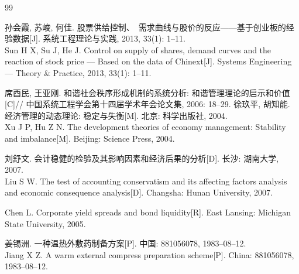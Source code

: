 \documentclass{setp-new}
\begin{document}
\begin{thebibliography}{99}


%
%
%
%
%
 孙会霞, 苏峻, 何佳. 股票供给控制、~需求曲线与股价的反应------基于创业板的经验数据[J]. 系统工程理论与实践, 2013, 33(1): 1--11. \\
Sun H X, Su J, He J. Control on supply of shares, demand curves and the reaction of stock price --- Based on the data of Chinext[J]. Systems Engineering --- Theory \& Practice, 2013, 33(1): 1--11.


%
%
%
 席酉民, 王亚刚. 和谐社会秩序形成机制的系统分析: 和谐管理理论的启示和价值[C]// 中国系统工程学会第十四届学术年会论文集, 2006: 18--29.
%
%
%
%
 徐玖平, 胡知能. 经济管理的动态理论: 稳定与失衡[M]. 北京: 科学出版社, 2004.\\
Xu J P, Hu Z N. The development theories of economy management: Stability and imbalance[M]. Beijing: Science Press, 2004.


%
%
 刘舒文. 会计稳健的检验及其影响因素和经济后果的分析[D]. 长沙: 湖南大学, 2007.\\
Liu S W. The test of accounting conservatism and its affecting factors analysis and economic
consequence analysis[D]. Changsha: Hunan University, 2007.


%
%
 Chen L. Corporate yield spreads and bond liquidity[R]. East Lansing: Michigan State University, 2005.


%
%
 姜锡洲. 一种温热外敷药制备方案[P]. 中国: 881056078, 1983--08--12.
\\Jiang X Z. A warm external compress preparation scheme[P]. China:  881056078, 1983--08--12.


\end{thebibliography}
\end{document}
